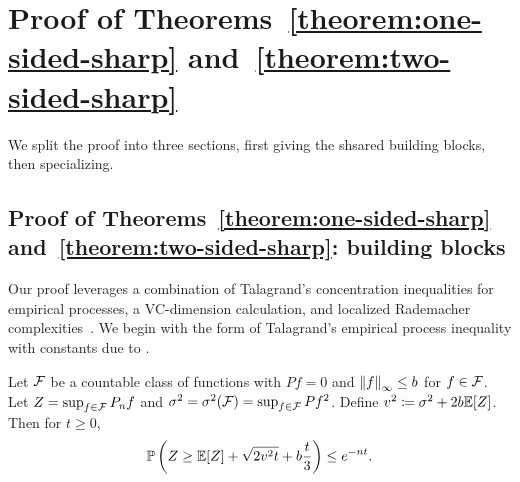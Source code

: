 \documentclass{article}
\newcommand{\radphi}{b_{\phi}}
\newcommand{\scorerv}{S}
\begin{document}

\section{Proof of Theorems~\ref{theorem:one-sided-sharp}
  and~\ref{theorem:two-sided-sharp}}
\label{sec:proof-sharp}

We split the proof into three sections, first giving the shsared
building blocks, then specializing.

\subsection{Proof of Theorems~\ref{theorem:one-sided-sharp}
  and~\ref{theorem:two-sided-sharp}: building blocks}
\label{sec:proof-sharp-building-blocks}

Our proof leverages a combination of Talagrand's concentration inequalities
for empirical processes, a VC-dimension calculation, and localized
Rademacher complexities~\cite{BartlettBoMe05, Koltchinskii06a}.
We begin with the form of Talagrand's empirical
process inequality with constants due to \citet{Bousquet02thesis}.

\begin{lemma}
  \label{lemma:talagrand}
  Let $\mathcal{F}$ be a countable class of functions with
  $Pf = 0$ and $\left\|{f}\right\|_\infty \le b$ for $f \in \mathcal{F}$. Let $Z = \sup_{f \in \mathcal{F}}
  P_n f$ and $\sigma^2 = \sigma^2(\mathcal{F}) = \sup_{f \in \mathcal{F}} Pf^2$.
  Define $v^2 \coloneqq \sigma^2 + 2b \mathbb{E}[Z]$.
  Then for $t \ge 0$,
  \begin{equation*}
    \mathbb{P}\left(Z \ge \mathbb{E}[Z] + \sqrt{2 v^2 t} + b\frac{t}{3}\right)
    \le e^{-nt}.
  \end{equation*}
\end{lemma}
\end{document}
